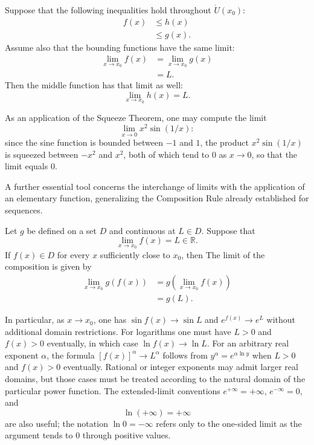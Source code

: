 \begin{theorem}
Suppose that the following inequalities hold throughout $\dot{U}(x_0)$:
\[
\begin{aligned}
f(x) &\leq h(x) \\
&\leq g(x).
\end{aligned}
\]
Assume also that the bounding functions have the same limit:
\[
\begin{aligned}
\lim_{x \to x_0} f(x) &= \lim_{x \to x_0} g(x) \\
&= L.
\end{aligned}
\]
Then the middle function has that limit as well:
\[
\lim_{x \to x_0} h(x) = L.
\]

\end{theorem}

As an application of the Squeeze Theorem, one may compute the limit \[
\lim_{x \to 0} x^2 \sin(1/x):
\] since the sine function is bounded between $-1$ and $1$, the product $x^2 \sin(1/x)$ is squeezed between $-x^2$ and $x^2$, both of which tend to $0$ as $x \to 0$, so that the limit equals $0$.

A further essential tool concerns the interchange of limits with the application of an elementary function, generalizing the Composition Rule already established for sequences.

\begin{theorem}
Let $g$ be defined on a set $D$ and continuous at $L\in D$. Suppose that
\[
\lim_{x \to x_0} f(x) = L \in \mathbb{R}.
\]
If $f(x)\in D$ for every $x$ sufficiently close to $x_0$, then
The limit of the composition is given by
\[
\begin{aligned}
\lim_{x \to x_0} g(f(x)) &= g\left( \lim_{x \to x_0} f(x) \right) \\
&= g(L).
\end{aligned}
\]

\end{theorem}

In particular, as $x \to x_0$, one has $\sin f(x) \to \sin L$ and
$e^{f(x)}\to e^L$ without additional domain restrictions. For logarithms
one must have $L>0$ and $f(x)>0$ eventually, in which case
$\ln f(x)\to\ln L$. For an arbitrary real exponent $\alpha$, the formula
$[f(x)]^\alpha\to L^\alpha$ follows from
$y^\alpha=e^{\alpha\ln y}$ when $L>0$ and $f(x)>0$ eventually. Rational or
integer exponents may admit larger real domains, but those cases must be
treated according to the natural domain of the particular power function.
The extended-limit conventions $e^{+\infty}=+\infty$,
$e^{-\infty}=0$, and
\[
\ln(+\infty)=+\infty
\]
 are also useful; the notation
$\ln0=-\infty$ refers only to the one-sided limit as the argument tends to
$0$ through positive values.

